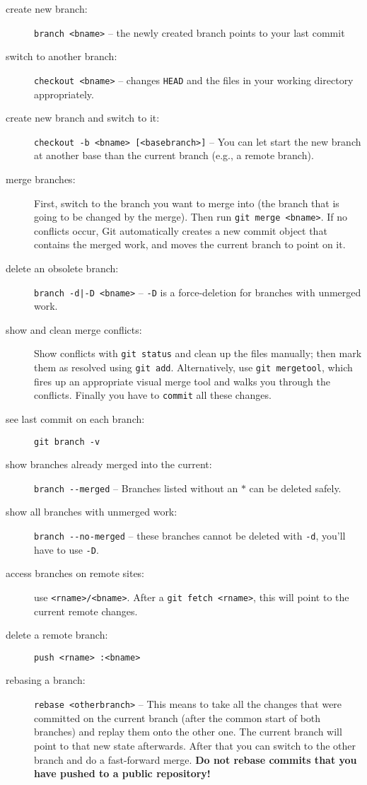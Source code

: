 \documentclass[a4paper,notumble]{leaflet} %
\begin{document}
\begin{description}
\item[create new branch:] \verb!branch <bname>! -- the newly created branch points to your last commit
\item[switch to another branch:] \texttt{checkout <bname>} -- changes \texttt{HEAD} and the files in your working directory appropriately.
\item[create new branch and switch to it:] \texttt{checkout -b <bname> [<basebranch>]} -- You can let start the new branch at another base than the current branch (e.g., a remote branch).
\item[merge branches:] First, switch to the branch you want to merge into (the branch that is going to be changed by the merge). Then run \texttt{git merge <bname>}. If no conflicts occur, Git automatically creates a new commit object that contains the merged work, and moves the current branch to point on it.
\item[delete an obsolete branch:] \texttt{branch -d|-D <bname>} -- \verb!-D! is a force-deletion for branches with unmerged work.
\item[show and clean merge conflicts:] Show conflicts with \texttt{git status} and clean up the files manually; then mark them as resolved using \texttt{git add}. Alternatively, use \texttt{git mergetool}, which fires up an appropriate visual merge tool and walks you through the conflicts. Finally you have to \texttt{commit} all these changes.
\item[see last commit on each branch:] \verb!git branch -v!
\item[show branches already merged into the current:] \verb!branch --merged! -- Branches listed without an $*$ can be deleted safely.
\item[show all branches with unmerged work:] \verb!branch --no-merged! -- these branches cannot be deleted with \verb!-d!, you'll have to use \verb!-D!.
\item[access branches on remote sites:] use \texttt{<rname>/<bname>}. After a \texttt{git fetch <rname>}, this will point to the current remote changes.
\item[delete a remote branch:] \texttt{push <rname> :<bname>}
\item[rebasing a branch:] \texttt{rebase <otherbranch>} -- This means to take all the changes that were committed on the current branch (after the common start of both branches) and replay them onto the other one. The current branch will point to that new state afterwards. After that you can switch to the other branch and do a fast-forward merge. \textbf{Do not rebase commits that you have pushed to a public repository!}
\end{description}
\end{document}
